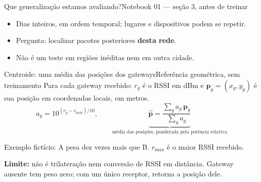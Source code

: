\begin{frame}{Que generalização estamos avaliando?}{Notebook 01 — seção 3, antes de treinar}
\centering
{}
\begin{itemize}
\item Dias inteiros, em ordem temporal; lugares e dispositivos podem se repetir.
\item Pergunta: localizar pacotes posteriores \textbf{desta rede}.
\item Não é um teste em regiões inéditas nem em outra cidade.
\end{itemize}
\end{frame}

\begin{frame}{Centroide: uma média das posições dos gateways}{Referência geométrica, sem treinamento}
\small
\setlength{\abovedisplayskip}{4pt}\setlength{\belowdisplayskip}{4pt}
Para cada gateway recebido: $r_g$ é o RSSI em dBm e $\mathbf p_g=(x_g,y_g)$
é sua posição em coordenadas locais, em metros.
\[
a_g=10^{(r_g-r_{\max})/10},
\qquad
\underbrace{\widehat{\mathbf p}=\frac{\sum_g a_g\,\mathbf p_g}{\sum_g a_g}}_{\text{média das posições, ponderada pela potência relativa}}
\]
\centering
{}
\par\vspace{2mm}\raggedright
Exemplo fictício: A pesa dez vezes mais que B. $r_{\max}$ é o maior RSSI recebido.
\par\vspace{2mm}
\textbf{Limite:} não é trilateração nem conversão de RSSI em distância.
Gateway ausente tem peso zero; com um único receptor, retorna a posição dele.
\end{frame}

